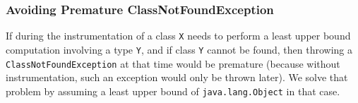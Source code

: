 \subsubsection*{Avoiding Premature ClassNotFoundException}
If during the instrumentation of a class \texttt{X}
\jnif{} needs to perform a least upper bound computation involving a type \texttt{Y},
and if class \texttt{Y} cannot be found,
then throwing a \texttt{ClassNotFoundException} at that time would be premature
(because without instrumentation, such an exception would only be thrown later).
We solve that problem by assuming a least upper bound of \verb=java.lang.Object= in that case.



%
%
%
%
%
%
%